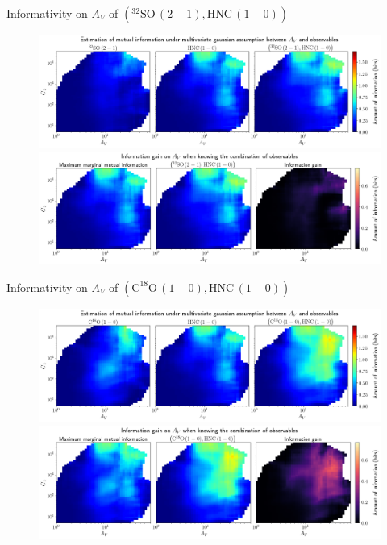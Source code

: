 \documentclass{beamer}
\begin{document}
\begin{frame}{Informativity on $A_V$ of $\left(\mathrm{^{32}SO\,(2-1)},\mathrm{HNC\,(1-0)}\right)$}
    \begin{figure}
        \centering
        \includegraphics[width=0.95\linewidth]{../linearinfogauss/av__32so21_hnc10_linearinfogauss.png}
        \vfill
        \includegraphics[width=0.95\linewidth]{../linearinfogauss/av__32so21_hnc10_linearinfogauss_gain.png}
    \end{figure}
\end{frame}

\begin{frame}{Informativity on $A_V$ of $\left(\mathrm{C^{18}O\,(1-0)},\mathrm{HNC\,(1-0)}\right)$}
    \begin{figure}
        \centering
        \includegraphics[width=0.95\linewidth]{../linearinfogauss/av__c18o10_hnc10_linearinfogauss.png}
        \vfill
        \includegraphics[width=0.95\linewidth]{../linearinfogauss/av__c18o10_hnc10_linearinfogauss_gain.png}
    \end{figure}
\end{frame}
\end{document}
